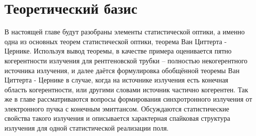 \chapter{Теоретический базис} \label{chapt1}
В настоящей главе будут разобраны элементы статистической оптики, а именно одна из основных теорем статистической оптики, теорема Ван Циттерта - Цернике. Используя вывод теоремы, в качестве примера оценивается пятно когерентности излучения для рентгеновской трубки -- полностью некогерентного источника излучения, и далее даётся формулировка обобщённой теоремы Ван Циттерта - Цернике в случае, когда на источнике излучения есть конечная область когерентности, или другими словами источник частично когерентен. Так же в главе рассматриваются вопросы формирования синхротронного излучения от электронного пучка с конечным эмиттансом. Обсуждаются статистические свойства такого излучения и описывается характерная спайковая структура излучения для одной статистической реализации поля.

